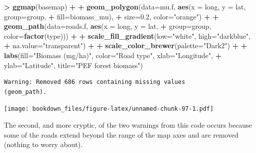 \documentclass[]{krantz}
\makeatletter
\newenvironment{Shaded}{\begin{snugshade}}{\end{snugshade}}
\newcommand{\DataTypeTok}[1]{\textcolor[rgb]{0.27,0.27,0.27}{#1}}
\newcommand{\FloatTok}[1]{\textcolor[rgb]{0.06,0.06,0.06}{#1}}
\newcommand{\KeywordTok}[1]{\textcolor[rgb]{0.27,0.27,0.27}{\textbf{#1}}}
\newcommand{\NormalTok}[1]{#1}
\newcommand{\OperatorTok}[1]{\textcolor[rgb]{0.43,0.43,0.43}{\textbf{#1}}}
\newcommand{\StringTok}[1]{\textcolor[rgb]{0.5,0.5,0.5}{#1}}
\newenvironment{kframe}{%
\medskip{}
\setlength{\fboxsep}{.8em}
 \def\at@end@of@kframe{}%
 \ifinner\ifhmode%
  \def\at@end@of@kframe{\end{minipage}}%
  \begin{minipage}{\columnwidth}%
 \fi\fi%
 \def\FrameCommand##1{\hskip\@totalleftmargin \hskip-\fboxsep
 \colorbox{shadecolor}{##1}\hskip-\fboxsep
     \hskip-\linewidth \hskip-\@totalleftmargin \hskip\columnwidth}%
 \MakeFramed {\advance\hsize-\width
   \@totalleftmargin\z@ \linewidth\hsize
   \@setminipage}}%
 {\par\unskip\endMakeFramed%
 \at@end@of@kframe}
\renewenvironment{Shaded}{\begin{kframe}}{\end{kframe}}
\makeatother
\begin{document}
\begin{Shaded}
\begin{Highlighting}[]
\OperatorTok{>}\StringTok{ }\KeywordTok{ggmap}\NormalTok{(basemap) }\OperatorTok{+}
\OperatorTok{+}\StringTok{     }\KeywordTok{geom_polygon}\NormalTok{(}\DataTypeTok{data=}\NormalTok{mu.f, }\KeywordTok{aes}\NormalTok{(}\DataTypeTok{x =}\NormalTok{ long, }\DataTypeTok{y =}\NormalTok{ lat, }\DataTypeTok{group=}\NormalTok{group, }
\OperatorTok{+}\StringTok{                                 }\DataTypeTok{fill=}\NormalTok{biomass_mu), }
\OperatorTok{+}\StringTok{                  }\DataTypeTok{size=}\FloatTok{0.2}\NormalTok{, }\DataTypeTok{color=}\StringTok{"orange"}\NormalTok{) }\OperatorTok{+}
\OperatorTok{+}\StringTok{     }\KeywordTok{geom_path}\NormalTok{(}\DataTypeTok{data=}\NormalTok{roads.f, }\KeywordTok{aes}\NormalTok{(}\DataTypeTok{x =}\NormalTok{ long, }\DataTypeTok{y =}\NormalTok{ lat, }
\OperatorTok{+}\StringTok{                                 }\DataTypeTok{group=}\NormalTok{group, }\DataTypeTok{color=}\KeywordTok{factor}\NormalTok{(type))) }\OperatorTok{+}
\OperatorTok{+}\StringTok{     }\KeywordTok{scale_fill_gradient}\NormalTok{(}\DataTypeTok{low=}\StringTok{"white"}\NormalTok{, }\DataTypeTok{high=}\StringTok{"darkblue"}\NormalTok{, }
\OperatorTok{+}\StringTok{                         }\DataTypeTok{na.value=}\StringTok{"transparent"}\NormalTok{) }\OperatorTok{+}
\OperatorTok{+}\StringTok{     }\KeywordTok{scale_color_brewer}\NormalTok{(}\DataTypeTok{palette=}\StringTok{"Dark2"}\NormalTok{) }\OperatorTok{+}
\OperatorTok{+}\StringTok{     }\KeywordTok{labs}\NormalTok{(}\DataTypeTok{fill=}\StringTok{"Biomass (mg/ha)"}\NormalTok{, }\DataTypeTok{color=}\StringTok{"Road type"}\NormalTok{, }\DataTypeTok{xlab=}\StringTok{"Longitude"}\NormalTok{, }
\OperatorTok{+}\StringTok{          }\DataTypeTok{ylab=}\StringTok{"Latitude"}\NormalTok{, }\DataTypeTok{title=}\StringTok{"PEF forest biomass"}\NormalTok{)}
\end{Highlighting}
\end{Shaded}

\begin{verbatim}
Warning: Removed 686 rows containing missing values
(geom_path).
\end{verbatim}

\texttt{[image: bookdown\_files/figure-latex/unnamed-chunk-97-1.pdf]}

The second, and more cryptic, of the two warnings from this code occurs because some of the roads extend beyond the range of the map axes and are removed (nothing to worry about).
\end{document}

